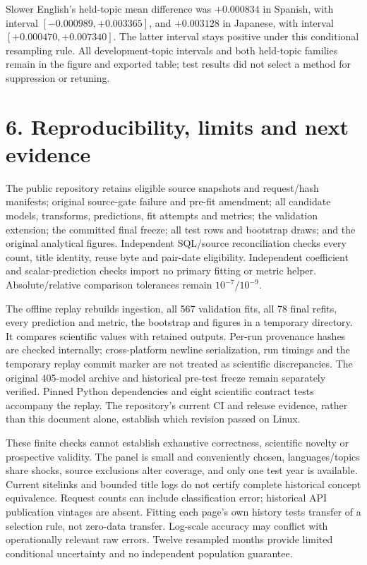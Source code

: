 \documentclass[11pt,letterpaper]{article}
\begin{document}
Slower English's held-topic mean difference was $+0.000834$ in Spanish, with interval $[-0.000989,\allowbreak +0.003365]$, and $+0.003128$ in Japanese, with interval $[+0.000470,\allowbreak +0.007340]$. The latter interval stays positive under this conditional resampling rule. All development-topic intervals and both held-topic families remain in the figure and exported table; test results did not select a method for suppression or retuning.

\newpage
\section*{6. Reproducibility, limits and next evidence}
The public repository retains eligible source snapshots and request/hash manifests; original source-gate failure and pre-fit amendment; all candidate models, transforms, predictions, fit attempts and metrics; the validation extension; the committed final freeze; all test rows and bootstrap draws; and the original analytical figures. Independent SQL/source reconciliation checks every count, title identity, reuse byte and pair-date eligibility. Independent coefficient and scalar-prediction checks import no primary fitting or metric helper. Absolute/relative comparison tolerances remain $10^{-7}$/$10^{-9}$.

The offline replay rebuilds ingestion, all 567 validation fits, all 78 final refits, every prediction and metric, the bootstrap and figures in a temporary directory. It compares scientific values with retained outputs. Per-run provenance hashes are checked internally; cross-platform newline serialization, run timings and the temporary replay commit marker are not treated as scientific discrepancies. The original 405-model archive and historical pre-test freeze remain separately verified. Pinned Python dependencies and eight scientific contract tests accompany the replay. The repository's current CI and release evidence, rather than this document alone, establish which revision passed on Linux.

These finite checks cannot establish exhaustive correctness, scientific novelty or prospective validity. The panel is small and conveniently chosen, languages/topics share shocks, source exclusions alter coverage, and only one test year is available. Current sitelinks and bounded title logs do not certify complete historical concept equivalence. Request counts can include classification error; historical API publication vintages are absent. Fitting each page's own history tests transfer of a selection rule, not zero-data transfer. Log-scale accuracy may conflict with operationally relevant raw errors. Twelve resampled months provide limited conditional uncertainty and no independent population guarantee.
\end{document}
